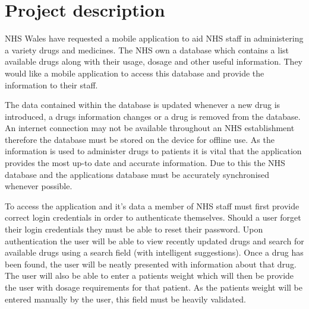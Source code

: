 \documentclass[11pt,fleqn,twoside]{article}
\begin{document}
\wordcount{}

\mmp

\setcounter{tocdepth}{3} %


\section{Project description}
NHS Wales have requested a mobile application to aid NHS staff in administering a variety drugs and medicines. The NHS own a database which contains a list available drugs along with their usage, dosage and other useful information. They would like a mobile application to access this database and provide the information to their staff.

The data contained within the database is updated whenever a new drug is introduced, a drugs information changes or a drug is removed from the database. An internet connection may not be available throughout an NHS establishment therefore the database must be stored on the device for offline use. As the information is used to administer drugs to patients it is vital that the application provides the most up-to date and accurate information. Due to this the NHS database and the applications database must be accurately synchronised whenever possible.

To access the application and it's data a member of NHS staff must first provide correct login credentials in order to authenticate themselves. Should a user forget their login credentials they must be able to reset their password. Upon authentication the user will be able to view recently updated drugs and search for available drugs using a search field (with intelligent suggestions). Once a drug has been found, the user will be neatly presented with information about that drug. The user will also be able to enter a patients weight which will then be provide the user with dosage requirements for that patient. As the patients weight will be entered manually by the user, this field must be heavily validated.
\end{document}
